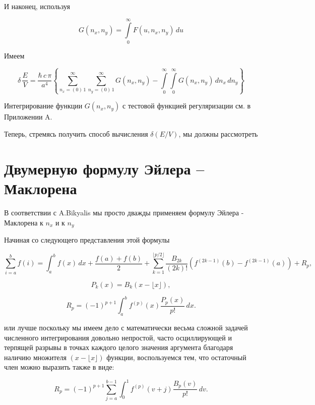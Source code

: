 \documentclass[11pt]{article}
\begin{document}
    И наконец, используя

    \begin{equation}
G\left(n_x, n_y\right) = \int\limits_{0}^{\infty}F\left(u, n_x, n_y\right)\,d{u}
\end{equation}

    Имеем

    \begin{equation}
\delta\,\frac{E}{V} = \frac{\hbar\,c\,\pi}{a^4}
\left\{
\sum\limits_{n_x=\left(0\right)\,1}^{\infty}
\sum\limits_{n_y=\left(0\right)\,1}^{\infty}
G\left(n_x, n_y\right)
-
\int\limits_{0}^{\infty}
\int\limits_{0}^{\infty}
G\left(n_x, n_y\right)
\,d{n_x}\,d{n_y}
\right\}
\end{equation}

Интегрирование функции \(G\left(n_x, n_y\right)\) с тестовой функцией
регуляризации см. в Приложении A.

    Теперь, стремясь получить способ вычисления \(\delta\left(E/V\right)\),
мы должны рассмотреть

\section{Двумерную формулу Эйлера --
Маклорена}\label{ux434ux432ux443ux43cux435ux440ux43dux443ux44e-ux444ux43eux440ux43cux443ux43bux443-ux44dux439ux43bux435ux440ux430-ux43cux430ux43aux43bux43eux440ux435ux43dux430}

В соответствии с A.Bikyalis \cite{Bikyalis1968} мы просто дважды
применяем формулу Эйлера - Маклорена к \(n_x\) и к \(n_y\)

Начиная со следующего представления этой формулы

\[{\displaystyle \sum _{i=a}^{b}f(i)=\int _{a}^{b}f(x)\,dx+{\frac {f(a)+f(b)}{2}}+\sum _{k=1}^{\lfloor p/2\rfloor }{\frac {B_{2k}}{(2k)!}}\left(f^{(2k-1)}(b)-f^{(2k-1)}(a)\right)+R_{p},}\]

\[{\displaystyle P_{k}(x)=B_{k}\left(x-\lfloor x\rfloor \right),}\]

\[{\displaystyle R_{p}=(-1)^{p+1}\int _{a}^{b}f^{(p)}(x){\frac {P_{p}(x)}{p!}}\,dx.}\]

или лучше поскольку мы имеем дело с математически весьма сложной задачей
численного интегрирования довольно непростой, часто осциллирующей и
терпящей разрывы в точках каждого целого значения аргумента благодаря
наличию множителя \((x-\lfloor x\rfloor )\) функции, воспользуемся тем,
что остаточный член можно выразить также в виде:

\[{\displaystyle R_{p}=(-1)^{p+1}\sum_{j=a}^{b-1} \int _{0}^{1}f^{(p)}(v+j){\frac {B_{p}(v)}{p!}}\,dv.}\]
\end{document}
